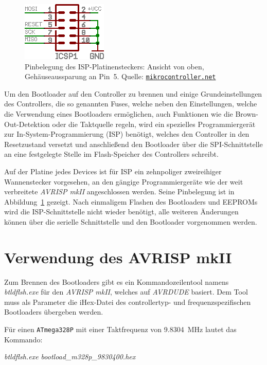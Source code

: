 \documentclass[paper=a4, parskip, numbers=noenddot, toc=listof, headsepline]{scrbook}
\begin{document}
			\begin{figure}[!h]
				\centering
				\includegraphics[width=.35\textwidth]{Bilder/isp}
				\caption{Pinbelegung des ISP-Platinensteckers: Ansicht von oben, Gehäuseaussparung an Pin~5. Quelle: \href{http://www.mikrocontroller.net}{\texttt{mikrocontroller.net}}}
				\label{fig:isp}
			\end{figure}

			Um den Bootloader auf den Controller zu brennen und einige Grundeinstellungen des Controllers, die so genannten Fuses, welche neben den Einstellungen, welche die Verwendung eines Bootloaders ermöglichen, auch Funktionen wie die Brown-Out-Detektion oder die Taktquelle regeln, wird ein spezielles Programmiergerät zur In-System-Programmierung (ISP) benötigt, welches den Controller in den Resetzustand versetzt und anschließend den Bootloader über die SPI-Schnittstelle an eine festgelegte Stelle im Flash-Speicher des Controllers schreibt.

			Auf der Platine jedes Devices ist für ISP ein zehnpoliger zweireihiger Wannenstecker vorgesehen, an den gängige Programmiergeräte wie der weit verbreitete \emph{AVRISP mkII} angeschlossen werden. Seine Pinbelegung ist in Abbildung~\ref{fig:isp} gezeigt. Nach einmaligem Flashen des Bootloaders und EEPROMs wird die ISP-Schnittstelle nicht wieder benötigt, alle weiteren Änderungen können über die serielle Schnittstelle und den Bootloader vorgenommen werden.

			\section{Verwendung des AVRISP mkII}

				Zum Brennen des Bootloaders gibt es ein Kommandozeilentool namens \emph{btldflsh.exe} für den \emph{AVRISP mkII}, welches auf \emph{AVRDUDE} basiert. Dem Tool muss als Parameter die iHex-Datei des controllertyp- und frequenzspezifischen Bootloaders übergeben werden.

				Für einen \texttt{ATmega328P} mit einer Taktfrequenz von \SI{9,8304}{\mega\hertz} lautet das Kommando:

				\begin{center}
					\emph{btldflsh.exe bootload\_m328p\_9830400.hex}
				\end{center}
\end{document}
